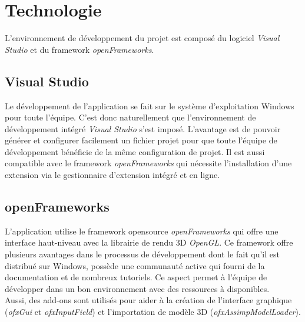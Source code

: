 \section{Technologie}
\label{s:technologie}
L'environnement de développement du projet est composé du logiciel \textit{Visual Studio} et du framework \textit{openFrameworks}.
\subsection{Visual Studio}
Le développement de l'application se fait sur le système d'exploitation Windows pour toute l'équipe. C'est donc naturellement que l'environnement de développement intégré \textit{Visual Studio} s'est imposé. L'avantage est de pouvoir générer et configurer facilement un fichier projet pour que toute l'équipe de développement bénéficie de la même configuration de projet. Il est aussi compatible avec le framework \textit{openFrameworks} qui nécessite l'installation d'une extension via le gestionnaire d'extension intégré et en ligne.
\subsection{openFrameworks}
L'application utilise le framework opensource \textit{openFrameworks} qui offre une interface haut-niveau avec la librairie de rendu 3D \textit{OpenGL}. Ce framework offre plusieurs avantages dans le processus de développement dont le fait qu'il est distribué sur Windows, possède une communauté active qui fourni de la documentation et de nombreux tutoriels. Ce aspect permet à l'équipe de développer dans un bon environnement avec des ressources à disponibles. \\
\newline
Aussi, des add-ons sont utilisés pour aider à la création de l'interface graphique (\textit{ofxGui} et \textit{ofxInputField}) et l'importation de modèle 3D (\textit{ofxAssimpModelLoader}).